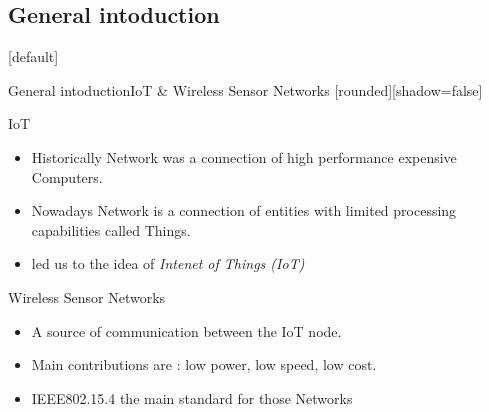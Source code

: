 \documentclass{beamer}
\makeatletter
\newenvironment{withoutheadline}{
        \setbeamertemplate{headline}[default]
        \def\beamer@entrycode{\vspace*{-\headheight}}
    }{}
\makeatother
\begin{document}
\subsection{General intoduction}
\begin{withoutheadline}
\begin{frame}{General intoduction}{IoT \& Wireless Sensor Networks}
[rounded][shadow=false]
  \begin{block}{IoT}
    \begin{itemize}
    \item Historically Network was a connection of high performance expensive Computers.
    \item Nowadays Network is a connection of entities with limited processing capabilities called Things. 
    \item  led us to the idea of {\em Intenet of Things (IoT)}
    \end{itemize}
  \end{block}
  
  
    \begin{block}{Wireless Sensor Networks}
    \begin{itemize}
    \item A source of communication between the IoT node.
    \item Main contributions are : low power, low speed, low cost.
    \item  IEEE802.15.4 the main standard for those Networks
    \end{itemize}
    \end{block}

  
  
\end{frame}
\end{withoutheadline}
\end{document}
